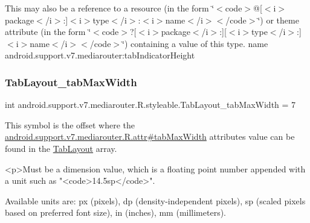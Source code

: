 This may also be a reference to a resource (in the form \char`\"{}$<$code$>$@\mbox{[}$<$i$>$package$<$/i$>$\+:\mbox{]}$<$i$>$type$<$/i$>$\+:$<$i$>$name$<$/i$>$$<$/code$>$\char`\"{}) or theme attribute (in the form \char`\"{}$<$code$>$?\mbox{[}$<$i$>$package$<$/i$>$\+:\mbox{]}\mbox{[}$<$i$>$type$<$/i$>$\+:\mbox{]}$<$i$>$name$<$/i$>$$<$/code$>$\char`\"{}) containing a value of this type.  name android.\+support.\+v7.\+mediarouter\+:tab\+Indicator\+Height \mbox{\label{classandroid_1_1support_1_1v7_1_1mediarouter_1_1R_1_1styleable_aa303d2e4537be04bf5a1500e95eccfe5}} 
\subsubsection{\texorpdfstring{Tab\+Layout\+\_\+tab\+Max\+Width}{TabLayout\_tabMaxWidth}}
{\footnotesize\ttfamily int android.\+support.\+v7.\+mediarouter.\+R.\+styleable.\+Tab\+Layout\+\_\+tab\+Max\+Width = 7\hspace{0.3cm}{\ttfamily [static]}}

This symbol is the offset where the \hyperlink{classandroid_1_1support_1_1v7_1_1mediarouter_1_1R_1_1attr_a5d37021f678dae9aba1c7ecb8fc25235}{android.\+support.\+v7.\+mediarouter.\+R.\+attr\#tab\+Max\+Width} attribute\textquotesingle{}s value can be found in the \hyperlink{classandroid_1_1support_1_1v7_1_1mediarouter_1_1R_1_1styleable_a94de1350e0a902b4a974d775f2f4f25e}{Tab\+Layout} array.

\begin{DoxyVerb}      <p>Must be a dimension value, which is a floating point number appended with a unit such as "<code>14.5sp</code>".
\end{DoxyVerb}
 Available units are\+: px (pixels), dp (density-\/independent pixels), sp (scaled pixels based on preferred font size), in (inches), mm (millimeters). 

